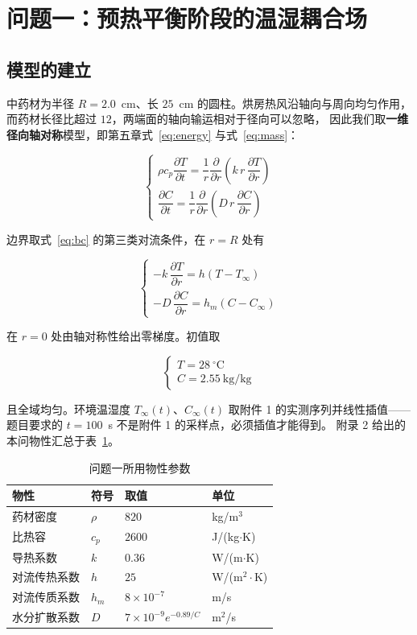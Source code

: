 \section{问题一：预热平衡阶段的温湿耦合场}

\subsection{模型的建立}

中药材为半径 $R=2.0$~cm、长 $25$~cm 的圆柱。烘房热风沿轴向与周向均匀作用，
而药材长径比超过 $12$，两端面的轴向输运相对于径向可以忽略，
因此我们取\textbf{一维径向轴对称}模型，即第五章式~\eqref{eq:energy} 与式~\eqref{eq:mass}：

\begin{equation}
\begin{cases}
\rho c_p\dfrac{\partial T}{\partial t}=\dfrac{1}{r}\dfrac{\partial}{\partial r}
\left(k\,r\,\dfrac{\partial T}{\partial r}\right)\\[16pt]
\dfrac{\partial C}{\partial t}=\dfrac{1}{r}\dfrac{\partial}{\partial r}
\left(D\,r\,\dfrac{\partial C}{\partial r}\right)
\end{cases}
\label{eq:q1gov}
\end{equation}

边界取式~\eqref{eq:bc} 的第三类对流条件，在 $r=R$ 处有

\[
\begin{cases}
-k\,\dfrac{\partial T}{\partial r}=h\left(T-T_\infty\right)\\[16pt]
-D\,\dfrac{\partial C}{\partial r}=h_m\left(C-C_\infty\right)
\end{cases}
\]

在 $r=0$ 处由轴对称性给出零梯度。初值取

\[
\begin{cases}
T=28~^\circ\text{C}\\[16pt]
C=2.55~\text{kg/kg}
\end{cases}
\]

且全域均匀。环境温湿度 $T_\infty(t)$、$C_\infty(t)$ 取附件 1 的实测序列并线性插值——
题目要求的 $t=100$~s 不是附件 1 的采样点，必须插值才能得到。
附录 2 给出的本问物性汇总于表~\ref{tab:q1props}。

\begin{table}[H]
  \centering
  \caption{问题一所用物性参数}\label{tab:q1props}
  \small
  \begin{tabular}{@{}llll@{}}
    \toprule
    物性 & 符号 & 取值 & 单位 \\
    \midrule
    药材密度 & $\rho$ & $820$ & kg/m$^3$ \\
    比热容 & $c_p$ & $2600$ & J/(kg$\cdot$K) \\
    导热系数 & $k$ & $0.36$ & W/(m$\cdot$K) \\
    对流传热系数 & $h$ & $25$ & W/(m$^2\cdot$K) \\
    对流传质系数 & $h_m$ & $8\times10^{-7}$ & m/s \\
    水分扩散系数 & $D$ & $7\times10^{-9}e^{-0.89/C}$ & m$^2$/s \\
    \bottomrule
  \end{tabular}
\end{table}

